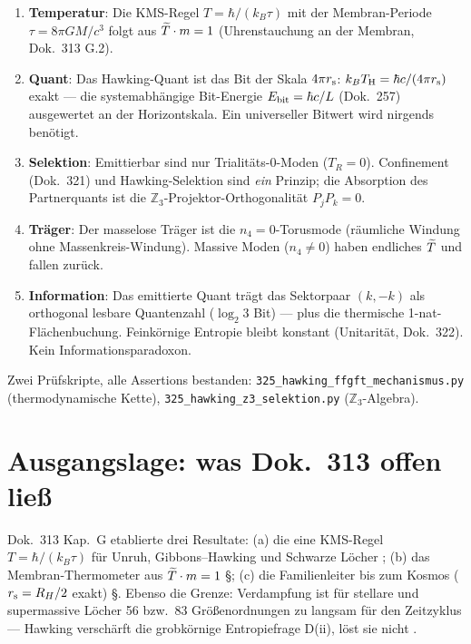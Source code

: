 \begin{enumerate}
  \item \textbf{Temperatur}: Die KMS-Regel $T = \hbar/(k_B\tau)$ mit der
    Membran-Periode $\tau = 8\pi GM/c^3$ folgt aus $\widetilde{T}\cdot m = 1$
    (Uhrenstauchung an der Membran, Dok.\ 313 G.2). \K
  \item \textbf{Quant}: Das Hawking-Quant ist das Bit der Skala $4\pi r_{\mathrm{s}}$:
    $k_BT_{\mathrm{H}} = \hbar c/(4\pi r_{\mathrm{s}})$ exakt — die systemabhängige Bit-Energie
    $E_{\mathrm{bit}} = \hbar c/L$ (Dok.\ 257) ausgewertet an der Horizontskala.
    Ein universeller Bitwert wird nirgends benötigt. \K
  \item \textbf{Selektion}: Emittierbar sind nur Trialitäts-0-Moden
    ($T_R = 0$). Confinement (Dok.\ 321) und Hawking-Selektion sind
    \emph{ein} Prinzip; die Absorption des Partnerquants ist die
    $\mathbb{Z}_3$-Projektor-Orthogonalität $P_jP_k = 0$. \B
  \item \textbf{Träger}: Der masselose Träger ist die $n_4 = 0$-Torusmode
    (räumliche Windung ohne Massenkreis-Windung). Massive Moden
    ($n_4 \neq 0$) haben endliches $\widetilde{T}$ und fallen zurück. \K
  \item \textbf{Information}: Das emittierte Quant trägt das Sektorpaar
    $(k, -k)$ als orthogonal lesbare Quantenzahl ($\log_2 3$ Bit) —
    plus die thermische 1-nat-Flächenbuchung. Feinkörnige Entropie bleibt
    konstant (Unitarität, Dok.\ 322). Kein Informationsparadoxon. \K
\end{enumerate}

Zwei Prüfskripte, alle Assertions bestanden:
\texttt{325\_hawking\_ffgft\_mechanismus.py} (thermodynamische Kette),
\texttt{325\_hawking\_z3\_selektion.py} ($\mathbb{Z}_3$-Algebra).



\section{Ausgangslage: was Dok.\ 313 offen ließ}

Dok.\ 313 Kap.\ G etablierte drei Resultate: (a) die eine KMS-Regel
$T = \hbar/(k_B\tau)$ für Unruh, Gibbons–Hawking und Schwarze Löcher \K;
(b) das Membran-Thermometer aus $\widetilde{T}\cdot m = 1$ \S; (c) die
Familienleiter bis zum Kosmos ($r_{\mathrm{s}} = R_H/2$ exakt) \S. Ebenso die
Grenze: Verdampfung ist für stellare und supermassive Löcher 56 bzw.\ 83
Größenordnungen zu langsam für den Zeitzyklus — Hawking verschärft die
grobkörnige Entropiefrage D(ii), löst sie nicht \K.

